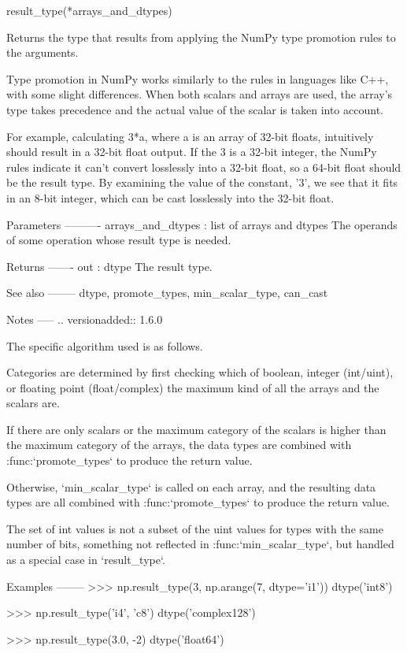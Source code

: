 \begin{DoxyVerb}result_type(*arrays_and_dtypes)

Returns the type that results from applying the NumPy
type promotion rules to the arguments.

Type promotion in NumPy works similarly to the rules in languages
like C++, with some slight differences.  When both scalars and
arrays are used, the array's type takes precedence and the actual value
of the scalar is taken into account.

For example, calculating 3*a, where a is an array of 32-bit floats,
intuitively should result in a 32-bit float output.  If the 3 is a
32-bit integer, the NumPy rules indicate it can't convert losslessly
into a 32-bit float, so a 64-bit float should be the result type.
By examining the value of the constant, '3', we see that it fits in
an 8-bit integer, which can be cast losslessly into the 32-bit float.

Parameters
----------
arrays_and_dtypes : list of arrays and dtypes
    The operands of some operation whose result type is needed.

Returns
-------
out : dtype
    The result type.

See also
--------
dtype, promote_types, min_scalar_type, can_cast

Notes
-----
.. versionadded:: 1.6.0

The specific algorithm used is as follows.

Categories are determined by first checking which of boolean,
integer (int/uint), or floating point (float/complex) the maximum
kind of all the arrays and the scalars are.

If there are only scalars or the maximum category of the scalars
is higher than the maximum category of the arrays,
the data types are combined with :func:`promote_types`
to produce the return value.

Otherwise, `min_scalar_type` is called on each array, and
the resulting data types are all combined with :func:`promote_types`
to produce the return value.

The set of int values is not a subset of the uint values for types
with the same number of bits, something not reflected in
:func:`min_scalar_type`, but handled as a special case in `result_type`.

Examples
--------
>>> np.result_type(3, np.arange(7, dtype='i1'))
dtype('int8')

>>> np.result_type('i4', 'c8')
dtype('complex128')

>>> np.result_type(3.0, -2)
dtype('float64')\end{DoxyVerb}
 \mbox{\label{namespacenumpy_1_1core_1_1multiarray_a317d5a0ab00fc014e007bf3c0aea238b}} 
